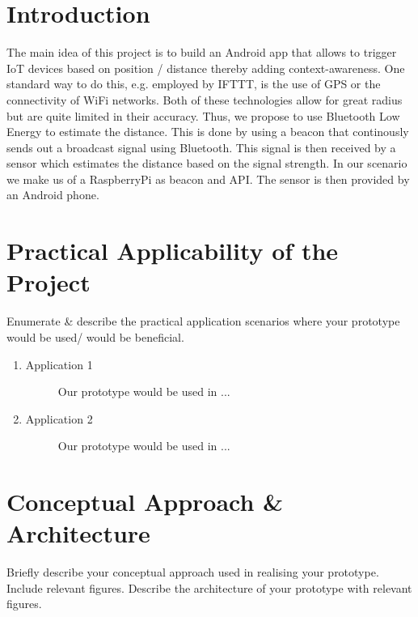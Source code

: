 \documentclass[
10pt, %
a4paper, %
oneside, %
headinclude,footinclude, %
BCOR5mm, %
]{scrartcl}
\begin{document}




\section{Introduction}
The main idea of this project is to build an Android app that allows to trigger IoT devices based on position / distance thereby adding context-awareness. One standard way to do this, e.g. employed by IFTTT, is the use of GPS or the connectivity of WiFi networks. Both of these technologies allow for great radius but are quite limited in their accuracy. Thus, we propose to use Bluetooth Low Energy to estimate the distance. This is done by using a beacon that continously sends out a broadcast signal using Bluetooth. This signal is then received by a sensor which estimates the distance based on the signal strength. In our scenario we make us of a RaspberryPi as beacon and API. The sensor is then provided by an Android phone.


\section{Practical Applicability of the Project}
Enumerate  \& describe  the practical application scenarios where your prototype would be used/ would be beneficial.
\begin{enumerate}
\item 
	\begin{description}
	\item[Application 1] Our prototype would be used in ...
	\end{description}
	\item 
	\begin{description}
	\item[Application 2] Our prototype would be used in ...
	\end{description}
\end{enumerate}

\section{Conceptual Approach \& Architecture}
Briefly describe your conceptual approach used in realising your prototype. Include relevant figures. Describe the architecture of your prototype with relevant figures.
\end{document}
